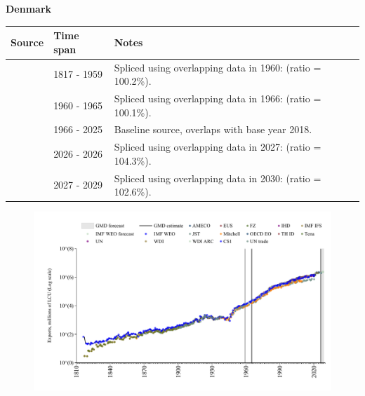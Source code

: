 \documentclass[12pt,a4paper,landscape]{article}
\begin{document}
\begin{adjustbox}{max totalsize={\paperwidth}{\paperheight},center}
\begin{minipage}[t][\textheight][t]{\textwidth}
\vspace*{0.5cm}
{}
\begin{center}
{\Large\bfseries Denmark}
\end{center}
\vspace{0.5cm}
\begin{table}[H]
\centering
\small
\begin{tabular}{|l|l|l|}
\hline
\textbf{Source} & \textbf{Time span} & \textbf{Notes} \\
\hline
\rowcolor{white}\cite{CS1_DNK}& 1817 - 1959 &Spliced using overlapping data in 1960: (ratio = 100.2\%).\\
\rowcolor{lightgray}\cite{AMECO}& 1960 - 1965 &Spliced using overlapping data in 1966: (ratio = 100.1\%).\\
\rowcolor{white}\cite{OECD_EO}& 1966 - 2025 &Baseline source, overlaps with base year 2018.\\
\rowcolor{lightgray}\cite{AMECO}& 2026 - 2026 &Spliced using overlapping data in 2027: (ratio = 104.3\%).\\
\rowcolor{white}\cite{IMF_WEO_forecast}& 2027 - 2029 &Spliced using overlapping data in 2030: (ratio = 102.6\%).\\
\hline
\end{tabular}
\end{table}
\begin{figure}[H]
\centering
\includegraphics[width=\textwidth,height=0.6\textheight,keepaspectratio]{graphs/DNK_exports.pdf}
\end{figure}
\end{minipage}
\end{adjustbox}
\end{document}
